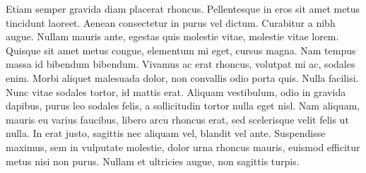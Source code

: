 Etiam semper gravida diam placerat rhoncus. Pellentesque in eros sit amet metus
tincidunt laoreet. Aenean consectetur in purus vel dictum. Curabitur a nibh
augue. Nullam mauris ante, egestas quis molestie vitae, molestie vitae lorem.
Quisque sit amet metus congue, elementum mi eget, cursus magna. Nam tempus massa
id bibendum bibendum. Vivamus ac erat rhoncus, volutpat mi ac, sodales enim.
Morbi aliquet malesuada dolor, non convallis odio porta quis. Nulla facilisi.
Nunc vitae sodales tortor, id mattis erat. Aliquam vestibulum, odio in gravida
dapibus, purus leo sodales felis, a sollicitudin tortor nulla eget nisl. Nam
aliquam, mauris eu varius faucibus, libero arcu rhoncus erat, sed scelerisque
velit felis ut nulla. In erat justo, sagittis nec aliquam vel, blandit vel
ante. Suspendisse maximus, sem in vulputate molestie, dolor urna rhoncus
mauris, euismod efficitur metus nisi non purus. Nullam et ultricies augue, non
sagittis turpis.

